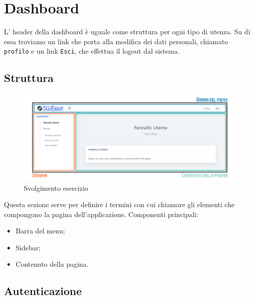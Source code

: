 \section{Dashboard}
  L' header della dashboard è uguale come struttura per ogni tipo di utenza. Su di essa troviamo un link che porta alla modifica dei dati personali, chiamato \texttt{profilo} e un link \texttt{Esci}, che effettua il logout dal sistema.



\subsection{Struttura}
    \begin{figure}[H]
        \centering
        \includegraphics[width=17cm]{sez/img/istruzioni/dashboardMod.png} 
        \caption{Svolgimento esercizio}\label{fig:1}
    \end{figure}
  Questa sezione serve per definire i termini con cui chiamare gli elementi che compongono la pagina dell'applicazione.
    Componenti principali:
    \begin{itemize}
        \item Barra del menu;
        \item {Sidebar};
        \item Contenuto della pagina.
    \end{itemize}


\subsection{Autenticazione}
